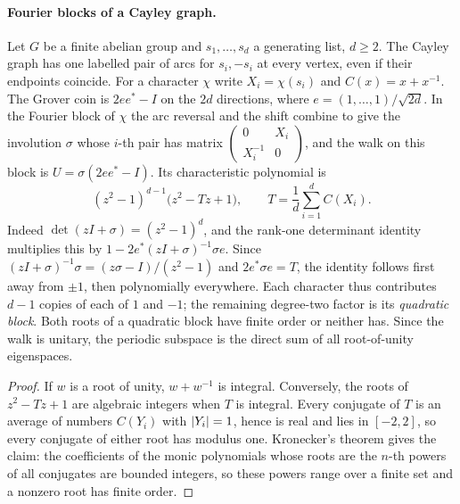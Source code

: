 \paragraph{Fourier blocks of a Cayley graph.}
Let $G$ be a finite abelian group and $s_1,\dots,s_d$ a generating list, $d\ge2$. The
Cayley graph has one labelled pair of arcs for $s_i,-s_i$ at every vertex, even if their
endpoints coincide. For a character $\chi$ write $X_i=\chi(s_i)$ and $C(x)=x+x^{-1}$. The
Grover coin is $2ee^*-I$ on the $2d$ directions, where $e=(1,\dots,1)/\sqrt{2d}$. In the
Fourier block of $\chi$ the arc reversal and the shift combine to give the involution
$\sigma$ whose $i$-th pair has matrix
$\left(\begin{smallmatrix}0&X_i\\X_i^{-1}&0\end{smallmatrix}\right)$, and the walk on this
block is $U=\sigma(2ee^*-I)$. Its characteristic polynomial is
\begin{equation}\label{gra:eq:groverblock}
 (z^2-1)^{d-1}\bigl(z^2-Tz+1\bigr),\qquad T=\frac1d\sum_{i=1}^dC(X_i).
\end{equation}
Indeed $\det(zI+\sigma)=(z^2-1)^d$, and the rank-one determinant identity multiplies this
by $1-2e^*(zI+\sigma)^{-1}\sigma e$. Since $(zI+\sigma)^{-1}\sigma=(z\sigma-I)/(z^2-1)$ and
$2e^*\sigma e=T$, the identity follows first away from $\pm1$, then polynomially
everywhere. Each character thus contributes $d-1$ copies of each of $1$ and $-1$; the
remaining degree-two factor is its \emph{quadratic block}. Both roots of a quadratic block
have finite order or neither has. Since the walk is unitary, the periodic subspace is the
direct sum of all root-of-unity eigenspaces.


\begin{proof}
If $w$ is a root of unity, $w+w^{-1}$ is integral. Conversely, the roots of $z^2-Tz+1$ are
algebraic integers when $T$ is integral. Every conjugate of $T$ is an average of numbers
$C(Y_i)$ with $\lvert Y_i\rvert=1$, hence is real and lies in $[-2,2]$, so every conjugate of
either root has modulus one. Kronecker's theorem gives the claim: the coefficients of the
monic polynomials whose roots are the $n$-th powers of all conjugates are bounded
integers, so these powers range over a finite set and a nonzero root has finite order.
\end{proof}

